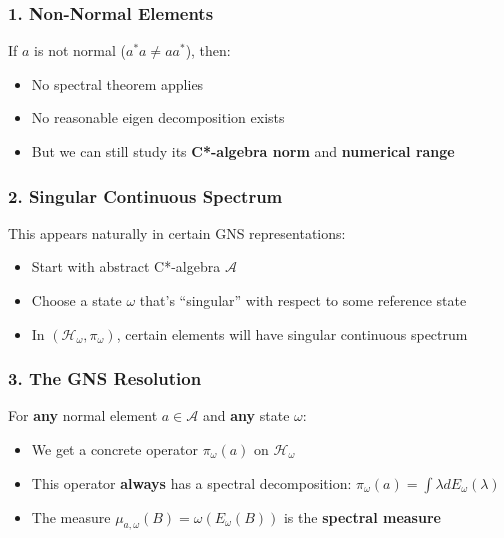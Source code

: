 \documentclass[aps,prl,reprint]{revtex4-2}
\begin{document}
\subsubsection*{1. Non-Normal Elements}

If $a$ is not normal ($a^*a \neq aa^*$), then:

\begin{itemize}
\item No spectral theorem applies

\item No reasonable eigen decomposition exists

\item But we can still study its \textbf{C*-algebra norm} and \textbf{%
numerical range}
\end{itemize}

\subsubsection*{2. Singular Continuous Spectrum}

This appears naturally in certain GNS representations:

\begin{itemize}
\item Start with abstract C*-algebra $\mathcal{A}$

\item Choose a state $\omega$ that's ``singular'' with respect to some
reference state

\item In $(\mathcal{H}_\omega, \pi_\omega)$, certain elements will have
singular continuous spectrum
\end{itemize}

\subsubsection*{3. The GNS Resolution}

For \textbf{any} normal element $a \in \mathcal{A}$ and \textbf{any} state $%
\omega$:

\begin{itemize}
\item We get a concrete operator $\pi_\omega(a)$ on $\mathcal{H}_\omega$

\item This operator \textbf{always} has a spectral decomposition: $%
\pi_\omega(a) = \int \lambda dE_\omega(\lambda)$

\item The measure $\mu_{a,\omega}(B) = \omega(E_\omega(B))$ is the \textbf{%
spectral measure}
\end{itemize}
\end{document}
